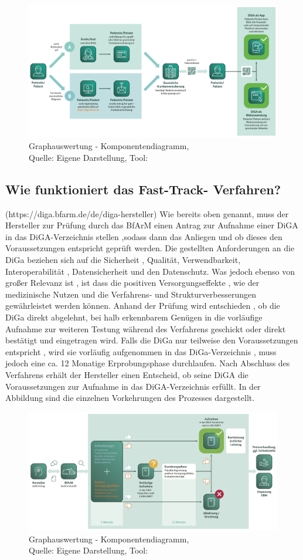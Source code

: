 \begin{figure}[H]
	\centering
	\includegraphics[width=450px, keepaspectratio]{assets/verordnungs_prozess.png}
	\caption{Graphauswertung - Komponentendiagramm,\\Quelle: Eigene Darstellung, Tool: \cite{visual_paradigm}}
\end{figure}






\subsection{Wie funktioniert das Fast-Track- Verfahren?}

(https://diga.bfarm.de/de/diga-hersteller)
Wie bereits oben genannt, muss der Hersteller zur Prüfung durch das BfArM einen Antrag zur Aufnahme einer DiGA in das DiGA-Verzeichnis stellen ,sodass dann das Anliegen und ob dieses den Voraussetzungen entspricht geprüft werden.
Die gestellten Anforderungen an die DiGa beziehen sich auf die Sicherheit , Qualität, Verwendbarkeit, Interoperabilität , Datensicherheit und den Datenschutz.
Was jedoch ebenso von großer Relevanz ist , ist dass die positiven Versorgungseffekte , wie der medizinische Nutzen und die Verfahrens- und Strukturverbesserungen gewährleistet werden können.
Anhand der Prüfung wird entschieden , ob die DiGa direkt abgelehnt, bei halb erkennbarem Genügen in die vorläufige Aufnahme zur weiteren Testung während des Verfahrens geschickt oder direkt bestätigt und eingetragen wird.
Falls die DiGa nur teilweise den Voraussetzungen entspricht , wird sie vorläufig aufgenommen in das DiGa-Verzeichnis , muss jedoch eine ca. 12 Monatige Erprobungsphase durchlaufen.
Nach Abschluss des Verfahrens erhält der Hersteller einen Entscheid, ob seine DiGA die Voraussetzungen zur Aufnahme in das DiGA-Verzeichnis erfüllt. 
In der Abbildung sind die einzelnen Vorkehrungen
des Prozesses dargestellt.

\begin{figure}[H]
	\centering
	\includegraphics[width=450px, keepaspectratio]{assets/fastTrack_prozess.png}
	\caption{Graphauswertung - Komponentendiagramm,\\Quelle: Eigene Darstellung, Tool: \cite{visual_paradigm}}
\end{figure}
